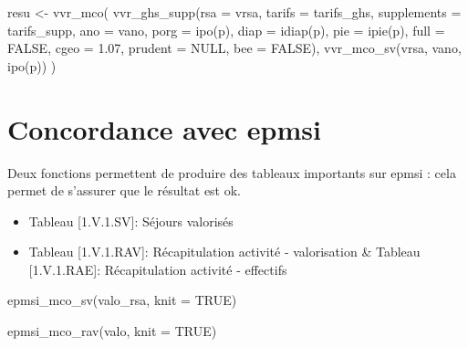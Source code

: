 \documentclass[
]{book}
\newenvironment{Shaded}{\begin{snugshade}}{\end{snugshade}}
\newcommand{\AttributeTok}[1]{\textcolor[rgb]{0.77,0.63,0.00}{#1}}
\newcommand{\ConstantTok}[1]{\textcolor[rgb]{0.00,0.00,0.00}{#1}}
\newcommand{\FloatTok}[1]{\textcolor[rgb]{0.00,0.00,0.81}{#1}}
\newcommand{\FunctionTok}[1]{\textcolor[rgb]{0.00,0.00,0.00}{#1}}
\newcommand{\NormalTok}[1]{#1}
\newcommand{\OtherTok}[1]{\textcolor[rgb]{0.56,0.35,0.01}{#1}}
\providecommand{\tightlist}{%
  \setlength{\itemsep}{0pt}\setlength{\parskip}{0pt}}
\begin{document}
\begin{Shaded}
\begin{Highlighting}[]
\NormalTok{resu }\OtherTok{\textless{}{-}} \FunctionTok{vvr\_mco}\NormalTok{(}
\FunctionTok{vvr\_ghs\_supp}\NormalTok{(}\AttributeTok{rsa =}\NormalTok{ vrsa, }
             \AttributeTok{tarifs =}\NormalTok{ tarifs\_ghs, }
             \AttributeTok{supplements =}\NormalTok{  tarifs\_supp, }
             \AttributeTok{ano =}\NormalTok{ vano, }
             \AttributeTok{porg =} \FunctionTok{ipo}\NormalTok{(p), }
             \AttributeTok{diap =} \FunctionTok{idiap}\NormalTok{(p), }
             \AttributeTok{pie =} \FunctionTok{ipie}\NormalTok{(p), }
             \AttributeTok{full =} \ConstantTok{FALSE}\NormalTok{,}
             \AttributeTok{cgeo =} \FloatTok{1.07}\NormalTok{, }
             \AttributeTok{prudent =} \ConstantTok{NULL}\NormalTok{,}
             \AttributeTok{bee =} \ConstantTok{FALSE}\NormalTok{),}
\FunctionTok{vvr\_mco\_sv}\NormalTok{(vrsa, vano, }\FunctionTok{ipo}\NormalTok{(p))}
\NormalTok{)}
\end{Highlighting}
\end{Shaded}

\hypertarget{concordance-avec-epmsi}{%
\section{Concordance avec epmsi}\label{concordance-avec-epmsi}}

Deux fonctions permettent de produire des tableaux importants sur epmsi : cela permet de s'assurer que le résultat est ok.

\begin{itemize}
\tightlist
\item
  Tableau {[}1.V.1.SV{]}: Séjours valorisés
\item
  Tableau {[}1.V.1.RAV{]}: Récapitulation activité - valorisation \& Tableau {[}1.V.1.RAE{]}: Récapitulation activité - effectifs
\end{itemize}

\begin{Shaded}
\begin{Highlighting}[]
\FunctionTok{epmsi\_mco\_sv}\NormalTok{(valo\_rsa, }\AttributeTok{knit =} \ConstantTok{TRUE}\NormalTok{)}
\end{Highlighting}
\end{Shaded}

\begin{Shaded}
\begin{Highlighting}[]
\FunctionTok{epmsi\_mco\_rav}\NormalTok{(valo, }\AttributeTok{knit =} \ConstantTok{TRUE}\NormalTok{)}
\end{Highlighting}
\end{Shaded}
\end{document}
